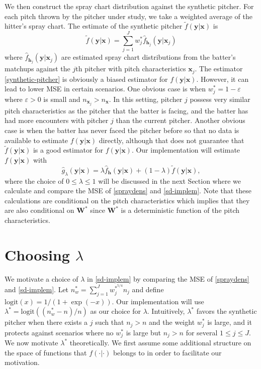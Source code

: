\documentclass[11pt]{article}
\newcommand{\W}{\textbf{W}}
\newcommand{\y}{\textbf{y}}
\newcommand{\x}{\textbf{x}}
\newcommand{\h}{\textbf{h}}
\newcommand{\Wstar}{\W^{\textstyle{*}}}
\newcommand{\wstar}{w^{\textstyle{*}}}
\newcommand{\wstarpwr}{w^{\textstyle{*}^{5/4}}}
\newcommand{\lamstar}{\lambda^{\textstyle{*}}}
\begin{document}
We then construct the spray chart distribution against the synthetic pitcher. For each pitch thrown by the pitcher under study, we take a weighted average of the hitter's spray chart. The estimate of the synthetic pitcher $\tilde{f}(\y|\x)$ is  
\begin{equation} \label{synthetic-pitcher}
  \tilde{f}(\y|\x) = \sum_{j=1}^J \wstar_j\hat{f}_{\h_j}(\y|\x_j)
\end{equation}
where $\hat{f}_{\h_j}(\y|\x_j)$ are estimated spray chart distributions from the batter's matchups against the $j$th pitcher with pitch characteristics $\x_j$. The estimator \eqref{synthetic-pitcher} is obviously a biased estimator for $f(\y|\x)$. However, it can lead to lower MSE in certain scenarios. One obvious case is when $\wstar_j = 1 - \varepsilon$ where $\varepsilon > 0$ is small and $n_{\x_j} > n_{\x}$. In this setting, pitcher $j$ possess very similar pitch characteristics as the pitcher that the batter is facing, and the batter has had more encounters with pitcher $j$ than the current pitcher. Another obvious case is when the batter has never faced the pitcher before so that no data is available to estimate $f(\y|\x)$ directly, although that does not guarantee that $\tilde{f}(\y|\x)$ is a good estimator for $f(\y|\x)$. Our implementation will estimate $f(\y|\x)$ with
\begin{equation} \label{sd-implem}
  \hat{g}_{\lambda}(\y|\x) = \lambda \hat f_\h(\y|\x) + (1 - \lambda)\tilde{f}(\y|\x),
\end{equation}
where the choice of $0 \leq \lambda \leq 1$ will be discussed in the next Section where we  calculate and compare the MSE of \eqref{spraydens} and \eqref{sd-implem}. Note that these calculations are conditional on the pitch characteristics which implies that they are also conditional on $\Wstar$ since $\Wstar$ is a deterministic function of the pitch characteristics.



\section{Choosing $\lambda$}

We motivate a choice of $\lambda$ in \eqref{sd-implem} by comparing the MSE of \eqref{spraydens} and \eqref{sd-implem}. Let $n_\wstar = \sum_{j=1}^J \wstarpwr_j n_j$ and define $\text{logit}(x) = 1/(1 + \exp(-x))$. Our implementation will use $\lamstar = \text{logit}\left((n_\wstar - n)/n\right)$ as our choice for $\lambda$. Intuitively, $\lamstar$ favors the synthetic pitcher when there exists a $j$ such that $n_j > n$ and the weight $\wstar_j$ is large, and it protects against scenarios where no $\wstar_j$ is large but $n_j > n$ for several $1 \leq j \leq J$. We now motivate $\lamstar$ theoretically. We first assume some additional structure on the space of functions that $f(\cdot|\cdot)$ belongs to in order to facilitate our motivation.
\end{document}
